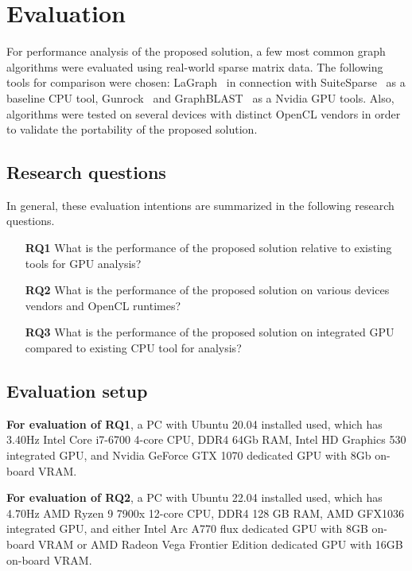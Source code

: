 \section{Evaluation}

For performance analysis of the proposed solution, a few most common graph algorithms were evaluated using real-world sparse matrix data. 
The following tools for comparison were chosen: LaGraph~\cite{misc:la_graph} in connection with SuiteSparse~\cite{article:suite_sparse_for_graph_problems} as a baseline CPU tool, Gunrock~\cite{article:gunrock} and GraphBLAST~\cite{yang2019graphblast} as a Nvidia GPU tools. 
Also, algorithms were tested on several devices with distinct OpenCL vendors in order to validate the portability of the proposed solution. 

\subsection{Research questions}

In general, these evaluation intentions are summarized in the following research questions. 

\vspace{0.2cm}
\begin{itemize}
    \item[\textbf{RQ1}] What is the performance of the proposed solution relative to existing tools for GPU analysis?

    \item[\textbf{RQ2}] What is the performance of the proposed solution on various devices vendors and OpenCL runtimes?

    \item[\textbf{RQ3}] What is the performance of the proposed solution on integrated GPU compared to existing CPU tool for analysis?
\end{itemize}

\subsection{Evaluation setup}

\textbf{For evaluation of RQ1}, a PC with Ubuntu 20.04 installed used, which has 3.40Hz Intel Core i7-6700 4-core CPU, DDR4 64Gb RAM, Intel HD Graphics 530 integrated GPU, and Nvidia GeForce GTX 1070 dedicated GPU with 8Gb on-board VRAM. 

\textbf{For evaluation of RQ2}, a PC with Ubuntu 22.04 installed used, which has 4.70Hz AMD Ryzen 9 7900x 12-core CPU, DDR4 128 GB RAM, AMD GFX1036 integrated GPU, and either Intel Arc A770 flux dedicated GPU with 8GB on-board VRAM or AMD Radeon Vega Frontier Edition dedicated GPU with 16GB on-board VRAM.

